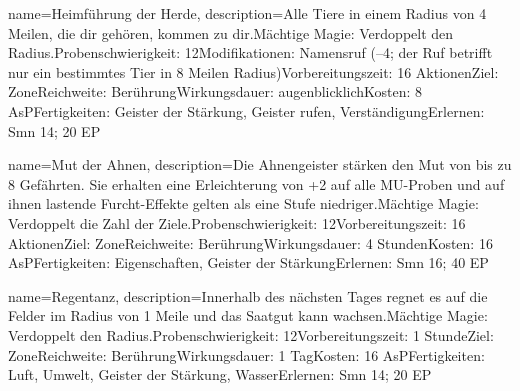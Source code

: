 {
    name={Heimführung der Herde},
    description={Alle Tiere in einem Radius von 4 Meilen, die dir gehören, kommen zu dir.\newline Mächtige Magie: Verdoppelt den Radius.\newline Probenschwierigkeit: 12\newline Modifikationen: Namensruf (–4; der Ruf betrifft nur ein bestimmtes Tier in 8 Meilen Radius)\newline Vorbereitungszeit: 16 Aktionen\newline Ziel: Zone\newline Reichweite: Berührung\newline Wirkungsdauer: augenblicklich\newline Kosten: 8 AsP\newline Fertigkeiten: Geister der Stärkung, Geister rufen, Verständigung\newline Erlernen: Smn 14; 20 EP}
}


{
    name={Mut der Ahnen},
    description={Die Ahnengeister stärken den Mut von bis zu 8 Gefährten. Sie erhalten eine Erleichterung von +2 auf alle MU-Proben und auf ihnen lastende Furcht-Effekte gelten als eine Stufe niedriger.\newline Mächtige Magie: Verdoppelt die Zahl der Ziele.\newline Probenschwierigkeit: 12\newline Vorbereitungszeit: 16 Aktionen\newline Ziel: Zone\newline Reichweite: Berührung\newline Wirkungsdauer: 4 Stunden\newline Kosten: 16 AsP\newline Fertigkeiten: Eigenschaften, Geister der Stärkung\newline Erlernen: Smn 16; 40 EP}
}


{
    name={Regentanz},
    description={Innerhalb des nächsten Tages regnet es auf die Felder im Radius von 1 Meile und das Saatgut kann wachsen.\newline Mächtige Magie: Verdoppelt den Radius.\newline Probenschwierigkeit: 12\newline Vorbereitungszeit: 1 Stunde\newline Ziel: Zone\newline Reichweite: Berührung\newline Wirkungsdauer: 1 Tag\newline Kosten: 16 AsP\newline Fertigkeiten: Luft, Umwelt, Geister der Stärkung, Wasser\newline Erlernen: Smn 14; 20 EP}
}


